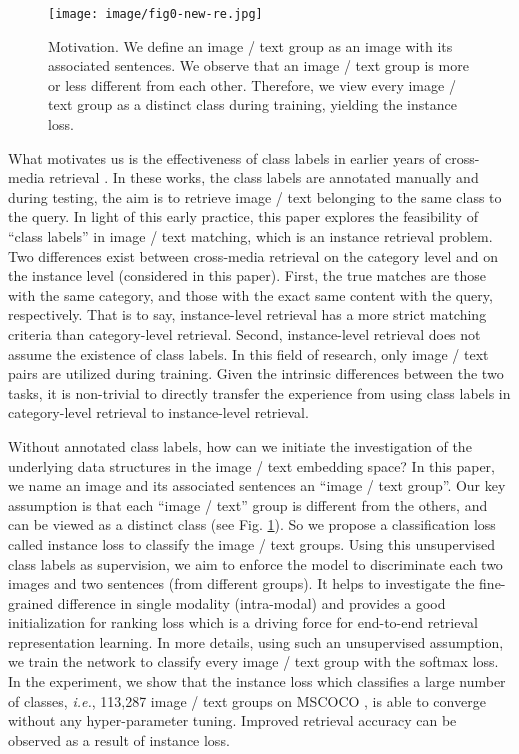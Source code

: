 \documentclass[10pt,final,journal]{IEEEtran}
\newcommand{\ie}{\mbox{\emph{i.e.}}}
\begin{document}
\begin{figure}[t]
\begin{center}
\texttt{[image: image/fig0-new-re.jpg]}
\end{center}
   \caption{Motivation. We define an image / text group as an image with its associated sentences. We observe that an image / text group is more or less different from each other. Therefore, we view every image / text group as a distinct class during training, yielding the instance loss. }
\label{fig:0}
\end{figure}

What motivates us is the effectiveness of class labels in earlier years of cross-media retrieval \cite{sharma2012generalized,wang2013learning,wu2013cross,wang2016multimodal,wei2017cross}. In these works, the class labels are annotated manually and during testing, the aim is to retrieve image / text belonging to the same class to the query. 
In light of this early practice, this paper explores the feasibility of ``class labels'' in image / text matching, which is an instance retrieval problem. Two differences exist between cross-media retrieval on the category level \cite{wu2013cross,wei2017cross} and on the instance level (considered in this paper). First, the true matches are those with the same category, and those with the exact same content with the query, respectively. That is to say, instance-level retrieval has a more strict matching criteria than category-level retrieval. Second, instance-level retrieval does not assume the existence of class labels. In this field of research, only image / text pairs are utilized during training. Given the intrinsic differences between the two tasks, it is non-trivial to directly transfer the experience from using class labels in category-level retrieval to instance-level retrieval. 

Without annotated class labels, how can we initiate the investigation of the underlying data structures in the image / text embedding space? In this paper, we name an image and its associated sentences an ``image / text group''. Our key assumption is that each ``image / text'' group is different from the others, and can be viewed as a distinct class (see Fig. \ref{fig:0}). 
So we propose a classification loss called instance loss to classify the image / text groups.
Using this unsupervised class labels as supervision, we aim to enforce the model to discriminate each two images and two sentences (from different groups). It helps to investigate the fine-grained difference in single modality (intra-modal) and provides a good initialization for ranking loss which is a driving force for end-to-end retrieval representation learning. In more details, using such an unsupervised assumption, we train the network to classify every image / text group with the softmax loss. In the experiment, we show that the instance loss which classifies a large number of classes, \ie, 113,287 image / text groups on MSCOCO \cite{lin2014microsoft}, is able to converge without any hyper-parameter tuning. Improved retrieval accuracy can  be observed as a result of instance loss.
\end{document}

